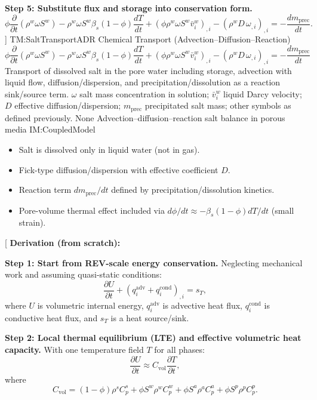 \documentclass[12pt]{article}
\newcommand{\deftheory}[9][Not Applicable]
{
\newpage
\noindent \rule{\textwidth}{0.5mm}

\paragraph{RefName: } \textbf{#2} \phantomsection
\label{#2}

\paragraph{Label:} #3

\noindent \rule{\textwidth}{0.5mm}

\paragraph{Equation:}
#4

\paragraph{Description:}
#5

\paragraph{Notes:}
#6

\paragraph{Source:}
#7

\paragraph{Ref.\ By:}
#8

\paragraph{Preconditions for \hyperref[#2]{#2}:}
\label{#2_precond}
#9

\paragraph{Derivation for \hyperref[#2]{#2}:}
\label{#2_deriv}
#1

\noindent \rule{\textwidth}{0.5mm}
}
\begin{document}
\textbf{Step 5: Substitute flux and storage into conservation form.}
\[
\phi \frac{\partial}{\partial t}\left(\rho^w\omega S^w\right)
-\rho^w\omega S^w\beta_s(1-\phi)\frac{dT}{dt}
+\left(\phi\rho^w\omega S^w\bar{v}_i^w\right)_{,i}
-\left(\rho^wD\,\omega_{,i}\right)_{,i}
= -\frac{dm_{\text{prec}}}{dt}.
\]
]
{TM:SaltTransportADR}
{Chemical Transport (Advection--Diffusion--Reaction)}
{
\[
\phi \frac{\partial}{\partial t}\left(\rho^{w}\omega S^{w}\right)
-\rho^{w}\omega S^{w}\beta_{s}(1-\phi)\frac{dT}{dt}
+\left(\phi\rho^{w}\omega S^{w}\bar{v}^{w}_{i}\right)_{,i}
-\left(\rho^{w}D\,\omega_{,i}\right)_{,i}
= -\frac{d m_{\mathrm{prec}}}{dt}
\]
}
{
Transport of dissolved salt in the pore water including storage, advection with liquid flow,
diffusion/dispersion, and precipitation/dissolution as a reaction sink/source term.
}
{
$\omega$ salt mass concentration in solution; $\bar{v}^w_i$ liquid Darcy velocity; $D$ effective diffusion/dispersion;
$m_{\mathrm{prec}}$ precipitated salt mass; other symbols as defined previously.
}
{None}
{Advection--diffusion--reaction salt balance in porous media}
{IM:CoupledModel}
{
\begin{itemize}
\item Salt is dissolved only in liquid water (not in gas).
\item Fick-type diffusion/dispersion with effective coefficient $D$.
\item Reaction term $dm_{\mathrm{prec}}/dt$ defined by precipitation/dissolution kinetics.
\item Pore-volume thermal effect included via $d\phi/dt \approx -\beta_s(1-\phi)dT/dt$ (small strain).
\end{itemize}
}
{}

\noindent
{}[
\textbf{Derivation (from scratch):}

\textbf{Step 1: Start from REV-scale energy conservation.}
Neglecting mechanical work and assuming quasi-static conditions:
\[
\frac{\partial U}{\partial t} + (q_i^{\text{adv}} + q_i^{\text{cond}})_{,i} = s_T,
\]
where $U$ is volumetric internal energy, $q_i^{\text{adv}}$ is advective heat flux,
$q_i^{\text{cond}}$ is conductive heat flux, and $s_T$ is a heat source/sink.

\textbf{Step 2: Local thermal equilibrium (LTE) and effective volumetric heat capacity.}
With one temperature field $T$ for all phases:
\[
\frac{\partial U}{\partial t} \approx C_{\text{vol}} \frac{\partial T}{\partial t},
\]
where
\[
C_{\text{vol}} =
(1-\phi)\rho^s C_p^s
+ \phi S^w \rho^w C_p^w
+ \phi S^a \rho^a C_p^a
+ \phi S^p \rho^p C_p^p.
\]
\end{document}
